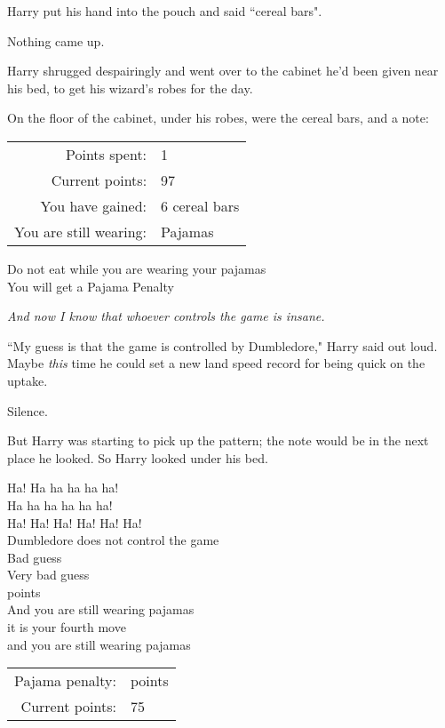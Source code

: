 Harry put his hand into the pouch and said ``cereal bars".

Nothing came up.

Harry shrugged despairingly and went over to the cabinet he'd been given near his bed, to get his wizard's robes for the day.

On the floor of the cabinet, under his robes, were the cereal bars, and a note:
\begin{writtenNote}
\begin{tabular}{rl}
Points spent: & 1\\
Current points: & 97\\
You have gained: & 6 cereal bars\\
You are still wearing: & Pajamas\\
\end{tabular}

Do not eat while you are wearing your pajamas\\
You will get a Pajama Penalty
\end{writtenNote}

\emph{And now I know that whoever controls the game is insane.}

``My guess is that the game is controlled by Dumbledore," Harry said out loud. Maybe \emph{this} time he could set a new land speed record for being quick on the uptake.

Silence.

But Harry was starting to pick up the pattern; the note would be in the next place he looked. So Harry looked under his bed.
\begin{writtenNote}
Ha! Ha ha ha ha ha!\\
Ha ha ha ha ha ha!\\
Ha! Ha! Ha! Ha! Ha! Ha!\\
Dumbledore does not control the game\\
Bad guess\\
Very bad guess\\
 points\\
And you are still wearing pajamas\\
it is your fourth move\\
and you are still wearing pajamas

\begin{tabular}{rl}
Pajama penalty: & \minus2 points\\
Current points: & 75
\end{tabular}
\end{writtenNote}

